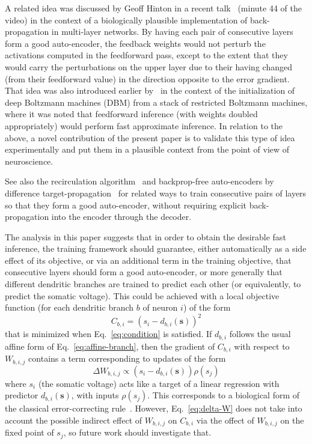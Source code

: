 \documentclass{article}
\newcommand   \vs{{\bm s}}
\begin{document}
A related idea was discussed by Geoff Hinton in a recent talk~\citep{Hinton-Stanford-talk-27-04-2016}
(minute 44 of the video) in the context of a biologically plausible implementation of back-propagation
in multi-layer networks.
By having each pair of consecutive layers form a good auto-encoder, the feedback weights would not
perturb the activations computed in the feedforward pass, except to the extent that they would carry the perturbations
on the upper layer due to their having changed (from their feedforward value)
in the direction opposite to the error gradient. That idea was also introduced earlier
by~\citet{Salakhutdinov2009-short} in the context of the initialization of deep Boltzmann
machines (DBM) from a stack of restricted Boltzmann machines, where it was noted that
feedforward inference (with weights doubled appropriately) would perform fast
approximate inference. In relation to the above, a novel contribution of the
present paper is to validate this type of idea
experimentally and put them in a plausible context from the point of view of neuroscience.

See also the recirculation algorithm~\citep{Hinton+McClelland-NIPS1987}
and backprop-free auto-encoders by difference target-propagation~\citep{Lee+Bengio-NIPSDL2014-small,Lee-et-al-MLKDB2015-small}
for related ways to train consecutive pairs of layers so that they form a good auto-encoder,
without requiring explicit back-propagation into the encoder through the decoder.

The analysis in this paper suggests that in order to obtain the desirable
fast inference, the training framework should guarantee, either automatically
as a side effect of its objective, or via an additional term in the training objective,
that consecutive layers should form a good auto-encoder, or more generally that
different dendritic branches are trained to predict each other (or equivalently,
to predict the somatic voltage). This could be achieved with a local
objective function (for each dendritic branch $b$ of neuron $i$) of the form
\begin{equation}
     C_{b,i} = (s_i - d_{b,i}(\vs))^2
\end{equation}
that is minimized when Eq.~\ref{eq:condition} is satisfied. If $d_{b,i}$
follows the usual affine form of Eq.~\ref{eq:affine-branch}, then
the gradient of $C_{b,i}$ with respect to $W_{b,i,j}$ contains a 
term corresponding to updates of the form
\begin{equation}
  \label{eq:delta-W}
   \Delta W_{b,i,j} \propto (s_i - d_{b,i}(\vs)) \rho(s_j)
\end{equation}
where $s_i$ (the somatic voltage) acts like a target of a linear
regression with predictor $d_{b,i}(\vs)$, with inputs $\rho(s_j)$. This corresponds to a biological form of the classical error-correcting
rule~\citep{Widrow62}. However, Eq.~\ref{eq:delta-W}
does not take into account the possible indirect effect of $W_{b,i,j}$ on $C_{b,i}$
via the offect of $W_{b,i,j}$ on the fixed point of $s_j$, so future work should
investigate that.
\end{document}
